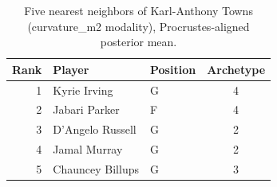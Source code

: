 \begin{table}[htbp]
  \centering\small
  \begin{tabular}{rllc}
    \toprule
    Rank & Player & Position & Archetype \\
    \midrule
    1 & Kyrie Irving & G & 4 \\
    2 & Jabari Parker & F & 4 \\
    3 & D'Angelo Russell & G & 2 \\
    4 & Jamal Murray & G & 2 \\
    5 & Chauncey Billups & G & 3 \\
    \bottomrule
  \end{tabular}
  \caption{Five nearest neighbors of Karl-Anthony Towns (curvature_m2 modality), Procrustes-aligned posterior mean.}
  \label{tab:Karl_Anthony_Towns_neighbors_curvature_m2}
\end{table}

